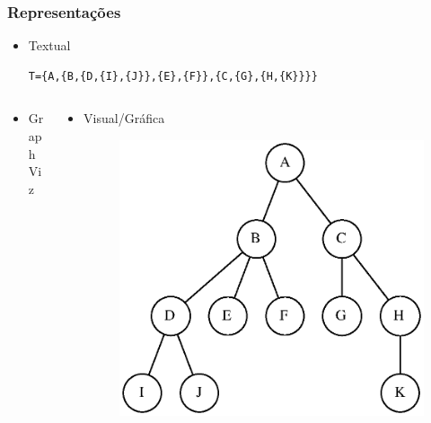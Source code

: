 \documentclass[aspectratio=169]{beamer}
\begin{document}
\begin{frame}[fragile]\frametitle{Representações}
\begin{itemize}
	\item Textual
\begin{lstlisting}[basicstyle=\ttfamily\scriptsize]
T={A,{B,{D,{I},{J}},{E},{F}},{C,{G},{H,{K}}}}
\end{lstlisting}
\end{itemize}
\begin{columns}[T]
\begin{column}{0.5\linewidth}
\begin{itemize}
	\item GraphViz
	
\end{itemize}
\end{column}
\begin{column}{0.5\linewidth}
\begin{itemize}
	\item Visual/Gráfica
\begin{figure}[h]
	\centering
	\includegraphics[height=0.4\paperheight]{imagens/arvore3.eps}
\end{figure}
\end{itemize}
\end{column}
\end{columns}
\end{frame}
\end{document}
